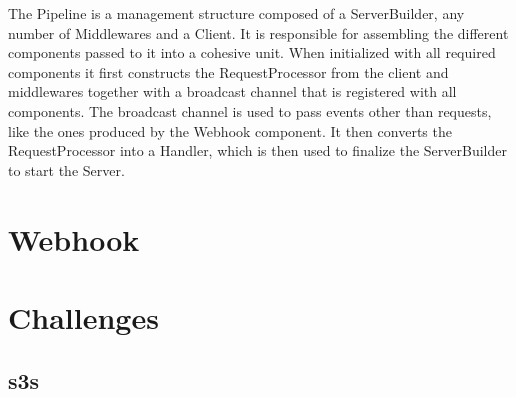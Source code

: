 The Pipeline is a management structure composed of a ServerBuilder, any number of Middlewares and a Client. It is responsible for assembling the different components passed to it into a cohesive unit. When initialized with all required components it first constructs the RequestProcessor from the client and middlewares together with a broadcast channel that is registered with all components. The broadcast channel is used to pass events other than requests, like the ones produced by the Webhook component. It then converts the RequestProcessor into a Handler, which is then used to finalize the ServerBuilder to start the Server.

\section{Webhook}

\section{Challenges}
\subsection{s3s}